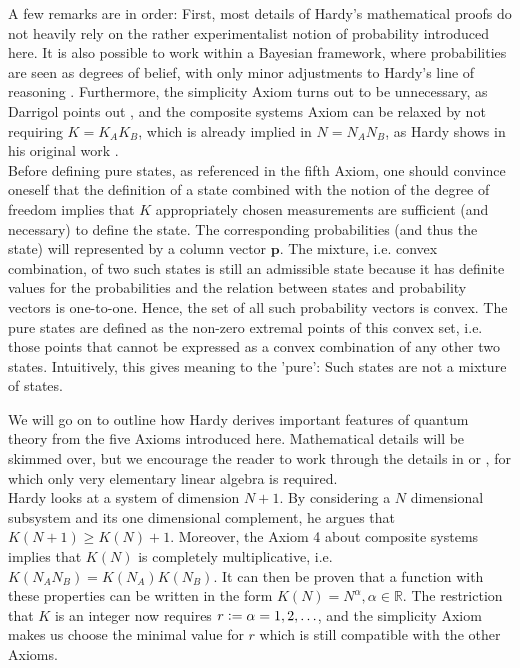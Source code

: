 \documentclass[11pt, a4paper]{article}
\newcommand{\defeq}{\vcentcolon=}
\newcommand{\R}{\mathbb{R}}
\begin{document}
A few remarks are in order: First, most details of Hardy's mathematical proofs do not heavily rely on the rather experimentalist notion of probability introduced here. It is also possible to work within a Bayesian framework, where probabilities are seen as degrees of belief, with only minor adjustments to Hardy's line of reasoning \cite{Schack_2003}. Furthermore, the simplicity Axiom turns out to be unnecessary, as Darrigol points out \cite{DARRIGOL}, and the composite systems Axiom can be relaxed by not requiring $K = K_AK_B$, which is already implied in $N = N_AN_B$, as Hardy shows in his original work \cite[Sect. 6.15]{hardy2001quantum}.\\
Before defining pure states, as referenced in the fifth Axiom, one should convince oneself that the definition of a state combined with the notion of the degree of freedom implies that $K$ appropriately chosen measurements are sufficient (and necessary) to define the state. The corresponding probabilities (and thus the state) will represented by a column vector $\mathbf p$. The mixture, i.e. convex combination, of two such states is still an admissible state because it has definite values for the probabilities and the relation between states and probability vectors is one-to-one. Hence, the set of all such probability vectors is convex. The pure states are defined as the non-zero extremal points of this convex set, i.e. those points that cannot be expressed as a convex combination of any other two states. Intuitively, this gives meaning to the 'pure': Such states are not a mixture of states. \par
\vspace{8pt}
We will go on to outline how Hardy derives important features of quantum theory from the five Axioms introduced here. Mathematical details will be skimmed over, but we encourage the reader to work through the details in \cite{hardy2001quantum} or \cite{DARRIGOL}, for which only very elementary linear algebra is required. \\
Hardy looks at a system of dimension $N+1$. By considering a $N$ dimensional subsystem and its one dimensional complement, he argues that $K(N+1)\geq K(N)+1$. Moreover, the Axiom 4 about composite systems implies that $K(N)$ is completely multiplicative, i.e. $K(N_A N_B)=K(N_A)K(N_B)$. It can then be proven that a function with these properties can be written in the form $K(N)=N^\alpha, \alpha\in\R$. The restriction that $K$ is an integer now requires $r\defeq\alpha=1,2,\ldots$, and the simplicity Axiom makes us choose the minimal value for $r$ which is still compatible with the other Axioms.\\
\end{document}
